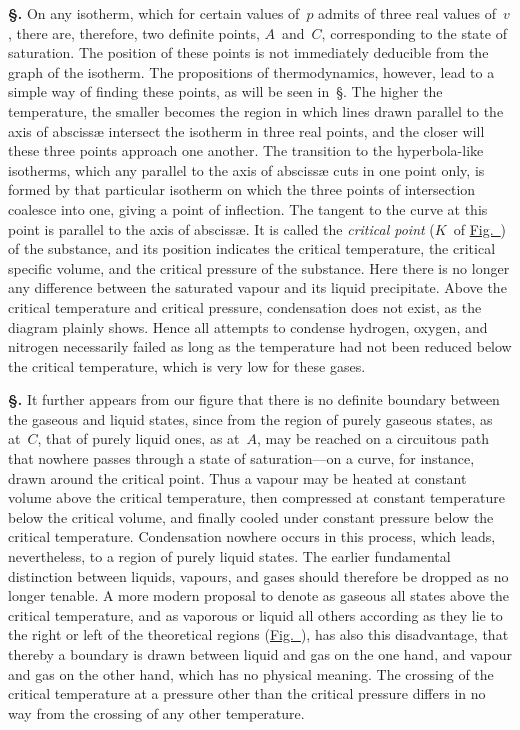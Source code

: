 \documentclass[12pt]{book}[2005/09/16]
\newcommand{\Section}[1]{
  \medskip\par\textbf{§\;#1}
  \label{section:#1}
}
\newcommand{\SecRef}[2][§\;]{\hyperref[section:#2.]{{\upshape #1#2}}}
\newcommand{\Fig}[1]{\hyperref[fig:#1]{Fig.~{\upshape #1}}}
\newcommand{\PageSep}[1]{\ignorespaces}
\begin{document}
\Section{28.} On any isotherm, which for certain values of~$p$
admits of three real values of~$v$, there are, therefore, two
definite points, $A$~and~$C$, corresponding to the state of
saturation. The position of these points is not immediately
deducible from the graph of the isotherm. The propositions
of thermodynamics, however, lead to a simple way of finding
these points, as will be seen in~\SecRef{172}. The higher the temperature,
%
the smaller becomes the region in which lines
drawn parallel to the axis of abscissæ intersect the isotherm
in three real points, and the closer will these three points
approach one another. The transition to the hyperbola-like
isotherms, which any parallel to the axis of abscissæ cuts
in one point only, is formed by that particular isotherm
on which the three points of intersection coalesce into one,
giving a point of inflection. The tangent to the curve at
%
this point is parallel to the axis of abscissæ. It is called
the \emph{critical point} ($K$~of \Fig{1}) of the substance, and its
%
%
%
%
position indicates the critical temperature, the critical
specific volume, and the critical pressure of the substance.
Here there is no longer any difference between the saturated
vapour and its liquid precipitate. Above the critical temperature
and critical pressure, condensation does not exist,
\PageSep{18}
as the diagram plainly shows. Hence all attempts to
condense hydrogen, oxygen, and nitrogen necessarily failed
as long as the temperature had not been reduced below
the critical temperature, which is very low for these
gases.

\Section{29.} It further appears from our figure that there is
no definite boundary between the gaseous and liquid states,
since from the region of purely gaseous states, as at~$C$,
that of purely liquid ones, as at~$A$, may be reached on
a circuitous path that nowhere passes through a state of
saturation---on a curve, for instance, drawn around the critical
point. Thus a vapour may be heated at constant volume
above the critical temperature, then compressed at constant
temperature below the critical volume, and finally cooled
under constant pressure below the critical temperature.
Condensation nowhere occurs in this process, which leads,
nevertheless, to a region of purely liquid states. The
earlier fundamental distinction between liquids, vapours,
and gases should therefore be dropped as no longer tenable.
A more modern proposal to denote as gaseous all states
above the critical temperature, and as vaporous or liquid
all others according as they lie to the right or left of the
theoretical regions (\Fig{1}), has also this disadvantage, that
thereby a boundary is drawn between liquid and gas on
the one hand, and vapour and gas on the other hand, which
has no physical meaning. The crossing of the critical
temperature at a pressure other than the critical pressure
differs in no way from the crossing of any other temperature.
\end{document}

